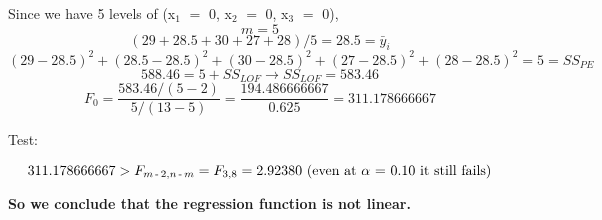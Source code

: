 \documentclass{article}
\newcommand{\mt}[1]{\ensuremath{#1}}
\newcommand{\afa}{\mt{\alpha} }
\newcommand{\lra}{ \mt{\longrightarrow} } %
\newcommand{\ms}{\mt{\operatorname{-}} }
\newcommand{\eql}{ \mt{\operatorname{=}} }
\newcommand{\uw}[2]{#1\mt{_{#2}}}
\newcommand{\eqn}[1]{\[#1\]}
\begin{document}
{{Since we have 5 levels of (\uw{x}{1} \eql 0, \uw{x}{2} \eql 0, \uw{x}{3} \eql 0),
\eqn{m = 5}
\eqn{(29 + 28.5 + 30 + 27 + 28) / 5 = 28.5 = \bar y_i}
\eqn{(29 - 28.5)^2 + (28.5 - 28.5)^2 + (30 - 28.5)^2 + (27 - 28.5)^2 + (28 - 28.5)^2 \eql 5 = SS_{PE}}
\eqn{588.46 = 5 + SS_{LOF} \lra SS_{LOF} = 583.46}
\eqn{F_0 = \frac{583.46 / (5 - 2)}{5 / (13 - 5)} = \frac{194.486666667}{0.625} = 311.178666667}

Test:

\eqn{311.178666667 > \uw{F}{m \ms 2, n \ms m} = F_{3, 8} = 2.92380 \textrm{ (even at \afa \eql 0.10 it still fails)}}

\textbf{So we conclude that the regression function is not linear.}

}

}

\newpage
\end{document}
